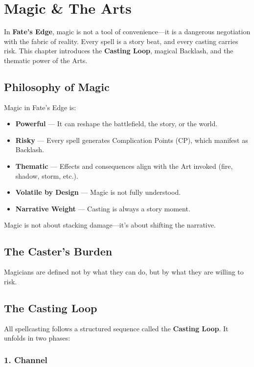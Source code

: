 
\chapter{Magic \& The Arts}

In \textbf{Fate's Edge}, magic is not a tool of convenience—it is a dangerous negotiation with the fabric of reality. Every spell is a story beat, and every casting carries risk. This chapter introduces the \textbf{Casting Loop}, magical Backlash, and the thematic power of the Arts.

\section{Philosophy of Magic}

Magic in Fate's Edge is:

\begin{itemize}
  \item \textbf{Powerful} — It can reshape the battlefield, the story, or the world.
  \item \textbf{Risky} — Every spell generates Complication Points (CP), which manifest as Backlash.
  \item \textbf{Thematic} — Effects and consequences align with the Art invoked (fire, shadow, storm, etc.).
  \item \textbf{Volatile by Design} — Magic is not fully understood.
  \item \textbf{Narrative Weight} — Casting is always a story moment.
\end{itemize}

Magic is not about stacking damage—it's about shifting the narrative.

\section{The Caster's Burden}

Magicians are defined not by what they can do, but by what they are willing to risk.

\section{The Casting Loop}

All spellcasting follows a structured sequence called the \textbf{Casting Loop}. It unfolds in two phases:

\subsection*{1. Channel}


